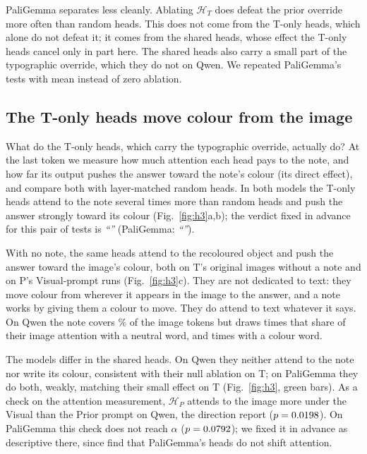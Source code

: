 \documentclass[letterpaper]{article}
\newcommand{\HP}{\mathcal{H}_P}
\newcommand{\HT}{\mathcal{H}_T}
\begin{document}
PaliGemma separates less cleanly. Ablating $\HT$ does defeat the prior override
more often than random heads. This does not come from the T-only heads, which
alone do not defeat it; it comes from the shared heads, whose effect the T-only
heads cancel only in part here. The shared heads also carry a small part of the
typographic override, which they do not on Qwen. We repeated PaliGemma's tests
with mean instead of zero ablation. \pgMeanSentence{}

\subsection{The T-only heads move colour from the image}\label{sec:h3}
What do the T-only heads, which carry the typographic override, actually do? At
the last token we measure how much attention each head pays to the note, and how
far its output pushes the answer toward the note's colour (its direct effect),
and compare both with layer-matched random heads. In both models the T-only
heads attend to the note several times more than random heads and push the
answer strongly toward its colour (Fig.~\ref{fig:h3}a,b); the verdict fixed in advance
for this pair of tests is \emph{``\hThreeMechanism''} (PaliGemma:
\emph{``\pgThreeMechanism''}).

With no note, the same heads attend to the recoloured object and push the answer
toward the image's colour, both on T's original images without a note and on P's Visual-prompt
runs (Fig.~\ref{fig:h3}c). They are not dedicated to text: they move colour from
wherever it appears in the image to the answer, and a note works by giving them
a colour to move. They do attend to text whatever it says. On Qwen the note
covers \noteShare\% of the image tokens but draws \enrichNeu{} times that share
of their image attention with a neutral word, and \enrichInc{} times with a
colour word.

The models differ in the shared heads. On Qwen they neither attend to the note
nor write its colour, consistent with their null ablation on T; on PaliGemma
they do both, weakly, matching their small effect on T (Fig.~\ref{fig:h3},
green bars). As a check on the attention measurement, $\HP$ attends to the image
more under the Visual than the Prior prompt on Qwen, the direction
\citet{lietzow2026} report ($p=0.0198$). On PaliGemma this check does
not reach $\alpha$ ($p=0.0792$); we fixed it in advance as
descriptive there, since \citet{lietzow2026} find that PaliGemma's heads do not
shift attention.
\end{document}
